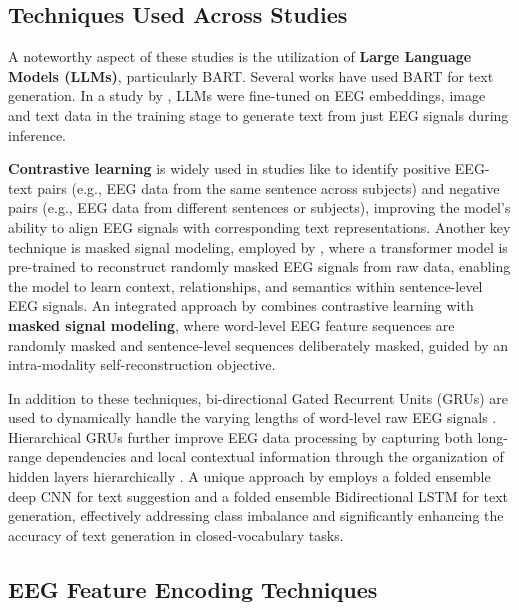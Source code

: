\subsection{Techniques Used Across Studies}

A noteworthy aspect of these studies is the utilization of \textbf{Large Language Models (LLMs)}, particularly BART. Several works \cite{wang2022open, liu2024eeg2text, wang2024enhancing, amrani2024deep, tao2024see, chen2025decoding} have used BART for text generation. In a study by \citet{mishra2024thought2text}, LLMs were fine-tuned on EEG embeddings, image and text data in the training stage to generate text from just EEG signals during inference.

\textbf{Contrastive learning} is widely used in studies like \cite{feng2023aligning, tao2024see, wang2024enhancing} to identify positive EEG-text pairs (e.g., EEG data from the same sentence across subjects) and negative pairs (e.g., EEG data from different sentences or subjects), improving the model's ability to align EEG signals with corresponding text representations. Another key technique is masked signal modeling, employed by \citet{liu2024eeg2text}, where a transformer model is pre-trained to reconstruct randomly masked EEG signals from raw data, enabling the model to learn context, relationships, and semantics within sentence-level EEG signals. An integrated approach by \citet{tao2024see} combines contrastive learning with \textbf{masked signal modeling}, where word-level EEG feature sequences are randomly masked and sentence-level sequences deliberately masked, guided by an intra-modality self-reconstruction objective.

In addition to these techniques, bi-directional Gated Recurrent Units (GRUs) are used to dynamically handle the varying lengths of word-level raw EEG signals \cite{amrani2024deep}. Hierarchical GRUs further improve EEG data processing by capturing both long-range dependencies and local contextual information through the organization of hidden layers hierarchically \cite{chen2025decoding}. A unique approach by \cite{rathod2024folded} employs a folded ensemble deep CNN for text suggestion and a folded ensemble Bidirectional LSTM for text generation, effectively addressing class imbalance and significantly enhancing the accuracy of text generation in closed-vocabulary tasks.

\subsection{EEG Feature Encoding Techniques}

